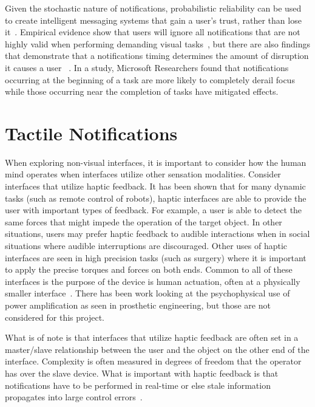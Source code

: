 Given the stochastic nature of notifications, probabilistic reliability can be
used to create intelligent messaging systems that gain a user's trust, rather
than lose it~\cite{leetiernan2001effective}. Empirical evidence show that users
will ignore all notifications that are not highly valid when performing
demanding visual tasks~\cite{maltz2000cue}, but there are also findings that
demonstrate that a notifications timing determines the amount of disruption it
causes a user ~\cite{cutrell2001notification}.  In a study, Microsoft
Researchers found that notifications occurring at the beginning of a task are
more likely to completely derail focus while those occurring near the completion
of tasks have mitigated effects.



\section{                  Tactile Notifications                             }

When exploring non-visual interfaces, it is important to consider how the human
mind operates when interfaces utilize other sensation modalities. Consider
interfaces that utilize haptic feedback.  It has been shown that for many
dynamic tasks (such as remote control of robots), haptic interfaces are able to
provide the user with important types of feedback.  For example, a user is able
to detect the same forces that might impede the operation of the target object.
In other situations, users may prefer haptic feedback to audible interactions
when in social situations where audible interruptions are discouraged.  Other
uses of haptic interfaces are seen in high precision tasks (such as surgery)
where it is important to apply the precise torques and forces on both ends.
Common to all of these interfaces is the purpose of the device is human
actuation, often at a physically smaller interface~\cite{ellis1996design}.
There has been work looking at the psychophysical use of power amplification
as seen in prosthetic engineering, but those are not considered for this
project.

What is of note is that interfaces that utilize haptic feedback are often set in
a master/slave relationship between the user and the object on the other end of
the interface. Complexity is often measured in degrees of freedom that the
operator has over the slave device.  What is important with haptic feedback is
that notifications have to be performed in real-time or else stale information
propagates into large control errors~\cite{ellis1996design}.





